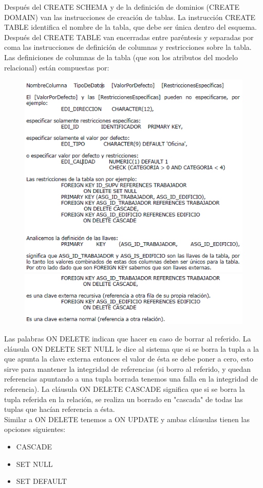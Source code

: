 \documentclass[preprint,12pt]{elsarticle}
\begin{document}
Después del CREATE SCHEMA y de la definición de dominios (CREATE DOMAIN) van las instrucciones de creación de tablas. La instrucción CREATE TABLE identifica el nombre de la tabla, que debe ser única dentro del esquema. Después del CREATE TABLE van encerradas entre paréntesis y separadas por coma las instrucciones de definición de columnas y restricciones sobre la tabla. Las definiciones de columnas de la tabla (que son los atributos del modelo relacional) están compuestas por:
	\begin{figure}[htb]
		\begin{center}
			\includegraphics[width=13cm]{./IMAGENES/definiciontab1}
			\includegraphics[width=13cm]{./IMAGENES/definiciontab2}
		\end{center}
	\end{figure}

Las palabras ON DELETE indican que hacer en caso de borrar al referido. La cláusula ON DELETE SET NULL le dice al sistema que si se borra la tupla a la que apunta la clave externa entonces el valor de ésta se debe poner a cero, esto sirve para mantener la integridad de referencias (si borro al referido, y quedan referencias apuntando a una tupla borrada tenemos una falla en la integridad de referencia). La cláusula ON DELETE CASCADE significa que si se borra la tupla referida en la relación, se realiza un borrado en "cascada" de todas las tuplas que hacían referencia a ésta. 
\\ Similar a ON DELETE tenemos a ON UPDATE y ambas cláusulas tienen las opciones siguientes:
\begin{itemize}
\item CASCADE
\item SET NULL
\item SET DEFAULT
\end{itemize}
\end{document}
